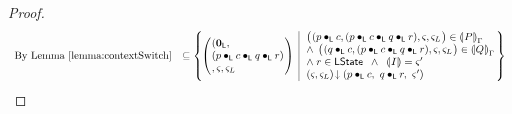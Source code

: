 \begin{lemma}
\begin{proof}
\[\begin{array}{r l}
	\text{By Lemma \ref{lemma:contextSwitch}} & 
	\subseteq \left\{
	\hspace*{-0.2cm}
	\begin{array}{l | l}
		\left(
		\hspace*{-0.15cm}
		\begin{array}{l}
		(\unitL, \\
		(p \composeL c \composeL q \composeL r)\\
		, \amod{}, \amod{L}
		\end{array}
		\hspace*{-0.15cm}
		\right)
		&
		\hspace*{-0.1cm}
		\begin{array}{l}
			\left(
			\hspace*{-0.15cm}
			\begin{array}{l}
			(p \composeL c, 
			(p \composeL c \composeL q \composeL r)
			, \amod{}, \amod{L}
			\end{array}
			\hspace*{-0.15cm}
			\right) \in \intermediateSem[\lenv]{P}\\
			
			\land\; \left(
			\hspace*{-0.15cm}
			\begin{array}{l}
			(q \composeL c, 
			(p \composeL c \composeL q \composeL r)
			, \amod{}, \amod{L}
			\end{array}
			\hspace*{-0.15cm}
			\right) \in \intermediateSem[\lenv]{Q}\\
			
			\land\; r \in \LState \;\;\land\;\; \intermediateSemI{I} = \amod{}'\\
			
			\extendsAM{\amod{}, \amod{L}}{p \composeL c}{\ q \composeL r}{\ \amod{}'}
		\end{array}
		\hspace*{-0.1cm}
	\end{array}
	\hspace*{-0.2cm}
	\right\} \\
	
	
	
	
	

\end{array}\]
\end{proof}
\end{lemma}
